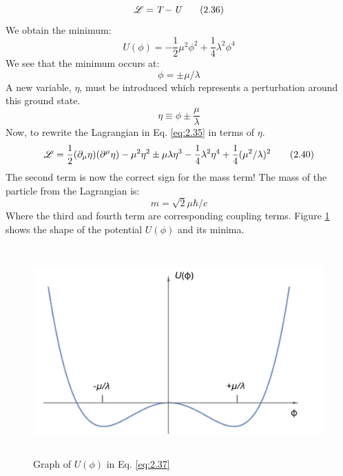 %
\begin{equation}\label{eq:2.36}
    \mathscr{L} = \textit{T} - \textit{U}
\tag{2.36}
\end{equation}
%
We obtain the minimum:
%
\begin{equation}\label{eq:2.37}
    \textit{U}(\phi) = -\frac{1}2\mu^{2}\phi^{2}+\frac{1}4\lambda^{2}\phi^{4}
\tag{2.37}
\end{equation}
%
We see that the minimum occurs at:
%
\begin{equation}\label{eq:2.38}
    \phi = \pm\mu/\lambda
\tag{2.38}
\end{equation}
%
A new variable, $\eta$, must be introduced which represents a perturbation around this ground state.
%
\begin{equation}\label{eq:2.39}
    \eta \equiv \phi \pm \frac{\mu}\lambda
\tag{2.39}
\end{equation}
%
Now, to rewrite the Lagrangian in Eq. \ref{eq:2.35} in terms of $\eta$.
%
\begin{equation}\label{eq:2.40}
    \mathscr{L} = \frac{1}2(\partial_{\mu}\eta)(\partial^{\mu}\eta)-\mu^{2}\eta^{2}\pm\mu\lambda\eta^{3}-\frac{1}4\lambda^{2}\eta^{4} + \frac{1}4(\mu^{2}/\lambda)^{2}
\tag{2.40}
\end{equation}
%
The second term is now the correct sign for the mass term! The mass of the particle from the Lagrangian is:
%
\begin{equation}\label{eq:2.41}
    m = \sqrt{2}\mu\hbar/c
\tag{2.41}
\end{equation}
%
Where the third and fourth term are corresponding coupling terms. Figure \ref{fig:2d_potential} shows 
the shape of the potential $U(\phi)$ and its minima. 
%
\begin{figure}[h]
    \includegraphics[width=0.8\linewidth,height=8cm]{figs/ch2/2d_potential.png}
    \centering
\caption{Graph of $\textit{U}(\phi)$ in Eq. \ref{eq:2.37}}
\label{fig:2d_potential}
\end{figure}
